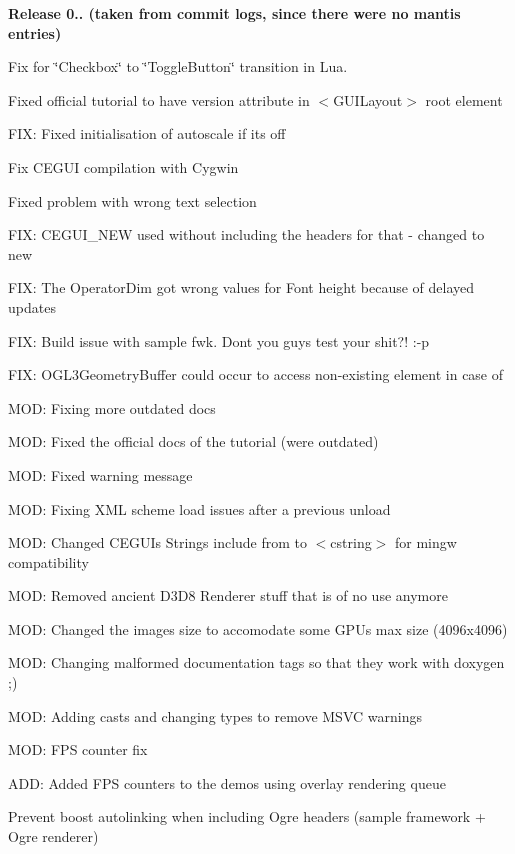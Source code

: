 {\bfseries{Release 0.. (taken from commit logs, since there were no mantis entries)}}
\begin{DoxyItemize}
\item Fix for \char`\"{}\+Checkbox\char`\"{} to \char`\"{}\+Toggle\+Button\char`\"{} transition in Lua.
\item Fixed official tutorial to have version attribute in $<$\+G\+U\+I\+Layout$>$ root element
\item F\+IX\+: Fixed initialisation of autoscale if its off
\item Fix C\+E\+G\+UI compilation with Cygwin
\item Fixed problem with wrong text selection
\item F\+IX\+: C\+E\+G\+U\+I\+\_\+\+N\+EW used without including the headers for that -\/ changed to new
\item F\+IX\+: The Operator\+Dim got wrong values for Font height because of delayed updates
\item F\+IX\+: Build issue with sample fwk. Don\textquotesingle{}t you guys test your shit?! \+:-\/p
\item F\+IX\+: O\+G\+L3\+Geometry\+Buffer could occur to access non-\/existing element in case of
\item M\+OD\+: Fixing more outdated docs
\item M\+OD\+: Fixed the official docs of the tutorial (were outdated)
\item M\+OD\+: Fixed warning message
\item M\+OD\+: Fixing X\+ML scheme load issues after a previous unload
\item M\+OD\+: Changed C\+E\+G\+UI\textquotesingle{}s String\textquotesingle{}s include from to $<$cstring$>$ for mingw compatibility
\item M\+OD\+: Removed ancient D3\+D8 Renderer stuff that is of no use anymore
\item M\+OD\+: Changed the image\textquotesingle{}s size to accomodate some G\+PU\textquotesingle{}s max size (4096x4096)
\item M\+OD\+: Changing malformed documentation tags so that they work with doxygen ;)
\item M\+OD\+: Adding casts and changing types to remove M\+S\+VC warnings
\item M\+OD\+: F\+PS counter fix
\item A\+DD\+: Added F\+PS counters to the demos using overlay rendering queue
\item Prevent boost autolinking when including Ogre headers (sample framework + Ogre renderer)

\end{DoxyItemize}
